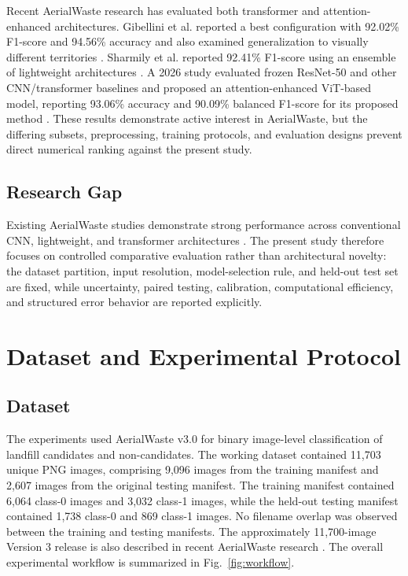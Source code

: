 \documentclass[journal]{IEEEtran}
\begin{document}
Recent AerialWaste research has evaluated both transformer and attention-enhanced architectures. Gibellini et al. reported a best configuration with 92.02\% F1-score and 94.56\% accuracy and also examined generalization to visually different territories \cite{gibellini2025pipeline}. Sharmily et al. reported 92.41\% F1-score using an ensemble of lightweight architectures \cite{sharmily2025landfill}. A 2026 study evaluated frozen ResNet-50 and other CNN/transformer baselines and proposed an attention-enhanced ViT-based model, reporting 93.06\% accuracy and 90.09\% balanced F1-score for its proposed method \cite{anvith2026secbam}. These results demonstrate active interest in AerialWaste, but the differing subsets, preprocessing, training protocols, and evaluation designs prevent direct numerical ranking against the present study.

\subsection{Research Gap}
Existing AerialWaste studies demonstrate strong performance across conventional CNN, lightweight, and transformer architectures \cite{torres2021illegal,gibellini2025pipeline,sharmily2025landfill,anvith2026secbam}. The present study therefore focuses on controlled comparative evaluation rather than architectural novelty: the dataset partition, input resolution, model-selection rule, and held-out test set are fixed, while uncertainty, paired testing, calibration, computational efficiency, and structured error behavior are reported explicitly.

\section{Dataset and Experimental Protocol}
\subsection{Dataset}
The experiments used AerialWaste v3.0 for binary image-level classification of landfill candidates and non-candidates. The working dataset contained 11,703 unique PNG images, comprising 9,096 images from the training manifest and 2,607 images from the original testing manifest. The training manifest contained 6,064 class-0 images and 3,032 class-1 images, while the held-out testing manifest contained 1,738 class-0 and 869 class-1 images. No filename overlap was observed between the training and testing manifests. The approximately 11,700-image Version 3 release is also described in recent AerialWaste research \cite{gibellini2025pipeline}. The overall experimental workflow is summarized in Fig.~\ref{fig:workflow}.
\end{document}
